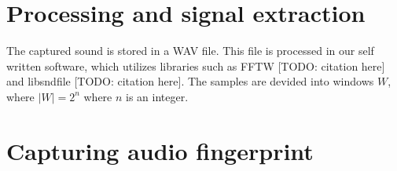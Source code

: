 \section{Processing and signal extraction}\label{sec:processing_signal_extraction}

The captured sound is stored in a WAV file.
This file is processed in our self written software, which utilizes libraries such as FFTW [TODO: citation here] and libsndfile [TODO: citation here].
The samples are devided into windows \( W \), where \( \lvert W \rvert = 2^{n} \) where \( n \) is an integer.

\section{Capturing audio fingerprint}\label{sec:capturing_audio_fingerprint}
